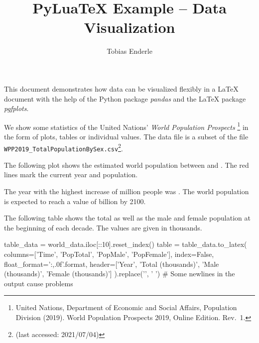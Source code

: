 \documentclass{article}
\title{PyLuaTeX Example -- Data Visualization}
\author{Tobias Enderle}
\begin{document}
\maketitle

This document demonstrates how data can be visualized flexibly in a \LaTeX{}
document with the help of the Python package \emph{pandas} and the \LaTeX{}
package \emph{pgfplots}.

We show some statistics of the United Nations' \emph{World Population Prospects}%
\footnote{United Nations, Department of Economic and Social Affairs, Population
Division (2019). World Population Prospects 2019, Online Edition. Rev.\ 1.} in the
form of plots, tables or individual values.
The data file \texttt{} is a subset of the file
\texttt{WPP2019\_TotalPopulationBySex.csv}\footnote{\dataurl{} (last accessed:
2021/07/04)}.

The following plot shows the estimated world population between 
and . The red lines mark the current year and population.

\begin{center}
\end{center}

The year with the highest increase of  million people
was . The world population is expected to reach a value
of  billion by 2100.

The following table shows the total as well as the male and female population at
the beginning of each decade. The values are given in thousands.
\begin{center}
\begin{python}
table_data = world_data.iloc[::10].reset_index()
table = table_data.to_latex(
    columns=['Time', 'PopTotal', 'PopMale', 'PopFemale'],
    index=False,
    float_format='{:,.0f}'.format,
    header=['Year', 'Total (thousands)', 'Male (thousands)', 'Female (thousands)']
).replace('\n', ' ')  # Some newlines in the output cause problems
\end{python}
\end{center}
\end{document}
